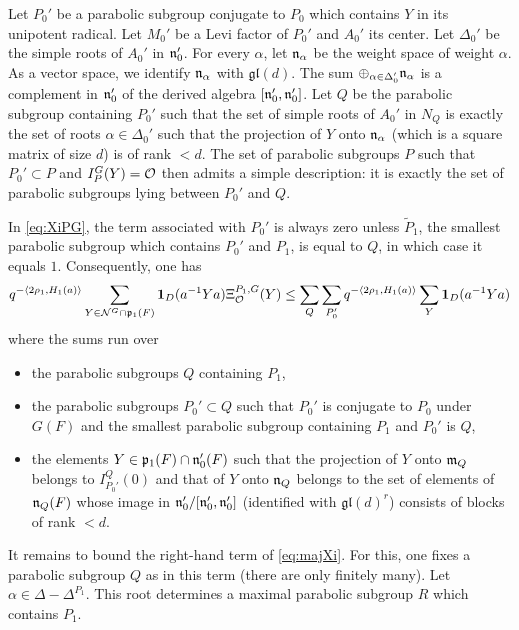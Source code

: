 \begin{paragr}
\begin{preuve}
Let $P_0'$ be a parabolic subgroup conjugate to $P_0$ which contains $Y$ in its unipotent radical. Let $M_0'$ be a Levi factor of $P_0'$ and $A_0'$ its center. Let $\Delta_0'$ be the \og simple roots\fg{} of $A_0'$ in $\mathfrak{n}_0'$. For every $\alpha$, let $\mathfrak{n}_\alpha$ be the weight space of weight $\alpha$. As a vector space, we identify $\mathfrak{n}_\alpha$ with $\mathfrak{gl}(d)$. The sum $\oplus_{\alpha\in \Delta_0'}\mathfrak{n}_\alpha$ is a complement in $\mathfrak{n}_0'$ of the derived algebra $[\mathfrak{n}_0',\mathfrak{n}_0']$. Let $Q$ be the parabolic subgroup containing $P_0'$ such that the set of simple roots of $A_0'$ in $N_Q$ is exactly the set of roots $\alpha\in \Delta_0'$ such that the projection of $Y$ onto $\mathfrak{n}_\alpha$ (which is a square matrix of size $d$) is of rank $<d$. The set of parabolic subgroups $P$ such that $P_0'\subset P$ and $I_P^G(Y)=\mathcal{O}$ then admits a simple description: it is exactly the set of parabolic subgroups lying between $P_0'$ and $Q$.

In \eqref{eq:XiPG}, the term associated with $P_0'$ is always zero unless $\tilde{P}_1$, the smallest parabolic subgroup which contains $P_0'$ and $P_1$, is equal to $Q$, in which case it equals $1$. Consequently, one has
\begin{equation}
  \label{eq:majXi}
  q^{-\langle 2\rho_1,H_1(a)\rangle}\sum_{Y\in \mathcal{N}^G\cap \mathfrak{p}_1(F)} \mathbf{1}_D(a^{-1}Ya)\Xi^{P_1,G}_{\mathcal{O}}(Y)\leq \sum_Q\sum_{P_0'} q^{-\langle 2\rho_1,H_1(a)\rangle}\sum_Y \mathbf{1}_D(a^{-1}Ya)
\end{equation}
where the sums run over
\begin{itemize}
\item[--] the parabolic subgroups $Q$ containing $P_1$,
\item[--] the parabolic subgroups $P_0'\subset Q$ such that $P_0'$ is conjugate to $P_0$ under $G(F)$ and the smallest parabolic subgroup containing $P_1$ and $P_0'$ is $Q$,
\item[--] the elements $Y\in \mathfrak{p}_1(F)\cap \mathfrak{n}_0'(F)$ such that the projection of $Y$ onto $\mathfrak{m}_Q$ belongs to $I^Q_{P_0'}(0)$ and that of $Y$ onto $\mathfrak{n}_Q$ belongs to the set of elements of $\mathfrak{n}_Q(F)$ whose image in $\mathfrak{n}_0'/[\mathfrak{n}_0',\mathfrak{n}_0']$ (identified with $\mathfrak{gl}(d)^r$) consists of \og blocks\fg{} of rank $<d$.
\end{itemize}

It remains to bound the right-hand term of \eqref{eq:majXi}. For this, one fixes a parabolic subgroup $Q$ as in this term (there are only finitely many). Let $\alpha\in \Delta-\Delta^{P_1}$. This root determines a maximal parabolic subgroup $R$ which contains $P_1$.


\end{preuve}
\end{paragr}
